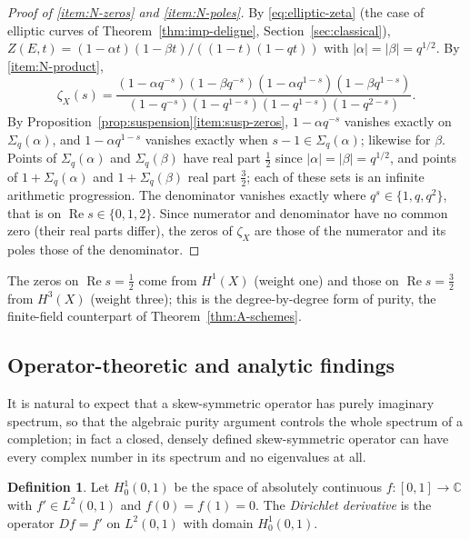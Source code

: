 \documentclass[11pt]{amsart}
\theoremstyle{plain}
\theoremstyle{definition}
\newtheorem{definition}[theorem]{Definition}
\theoremstyle{remark}
\numberwithin{equation}{section}
\newcommand{\C}{\mathbb{C}}
\DeclareMathOperator{\Rea}{Re}
\renewcommand{\Re}{\Rea}
\begin{document}
\begin{proof}[Proof of \ref{item:N-zeros} and \ref{item:N-poles}]
By \eqref{eq:elliptic-zeta} (the case of elliptic curves of
Theorem~\ref{thm:imp-deligne}, Section~\ref{sec:classical}),
$Z(E,t)=(1-\alpha t)(1-\beta t)/((1-t)(1-qt))$ with
$|\alpha|=|\beta|=q^{1/2}$. By \ref{item:N-product},
\[
\zeta_X(s)=\frac{(1-\alpha q^{-s})(1-\beta q^{-s})
(1-\alpha q^{1-s})(1-\beta q^{1-s})}
{(1-q^{-s})(1-q^{1-s})(1-q^{1-s})(1-q^{2-s})}.
\]
By Proposition~\ref{prop:suspension}\ref{item:susp-zeros},
$1-\alpha q^{-s}$ vanishes exactly on $\Sigma_q(\alpha)$, and
$1-\alpha q^{1-s}$ vanishes exactly when $s-1\in\Sigma_q(\alpha)$;
likewise for $\beta$. Points of $\Sigma_q(\alpha)$ and
$\Sigma_q(\beta)$ have real part $\tfrac12$ since
$|\alpha|=|\beta|=q^{1/2}$, and points of $1+\Sigma_q(\alpha)$ and
$1+\Sigma_q(\beta)$ real part $\tfrac32$; each of these sets is an
infinite arithmetic
progression. The denominator vanishes exactly where $q^{s}\in\{1,q,q^2\}$,
that is on $\Re s\in\{0,1,2\}$. Since numerator and denominator have no
common zero (their real parts differ), the zeros of $\zeta_X$ are those
of the numerator and its poles those of the denominator.
\end{proof}

The zeros on $\Re s=\tfrac12$ come from $H^1(X)$ (weight one) and those
on $\Re s=\tfrac32$ from $H^3(X)$ (weight three); this is the
degree-by-degree form of purity, the finite-field counterpart of
Theorem~\ref{thm:A-schemes}.


\subsection{Operator-theoretic and analytic findings}
\label{subsec:neg-operator}

It is natural to expect that a skew-symmetric operator has purely
imaginary spectrum, so that the algebraic purity argument controls the
whole spectrum of a completion; in fact a closed, densely defined
skew-symmetric operator can have every complex number in its spectrum
and no eigenvalues at all.

\begin{definition}\label{def:R4-D}
Let $H^1_0(0,1)$ be the space of absolutely continuous
$f:[0,1]\to\C$ with $f'\in L^2(0,1)$ and $f(0)=f(1)=0$. The
\emph{Dirichlet derivative} is the operator $Df=f'$ on $L^2(0,1)$ with
domain $H^1_0(0,1)$.
\end{definition}
\end{document}
